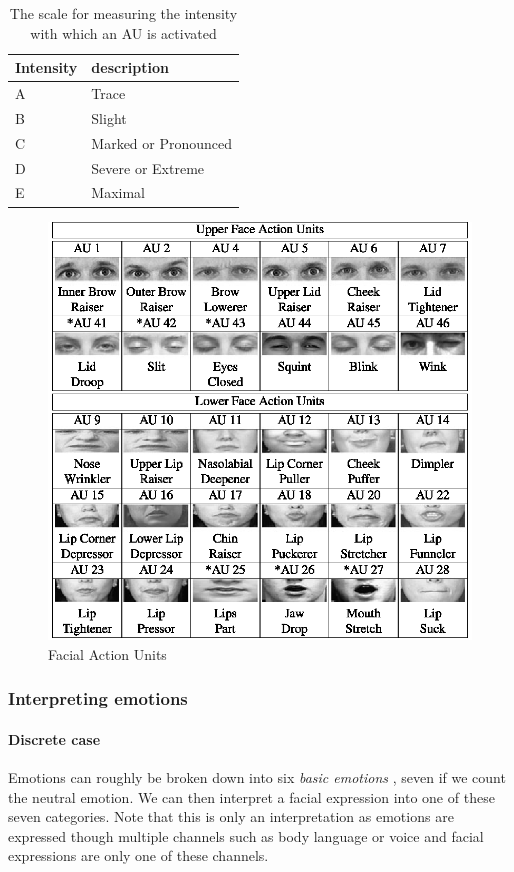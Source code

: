 \documentclass[12pt,twoside]{article}
\begin{document}
\begin{table}[ht]
\centering
\begin{tabular}{|l|l|}
 \hline
 Intensity & description\\
 \hline
 A & Trace                \\
 B & Slight               \\
 C & Marked or Pronounced \\
 D & Severe or Extreme    \\
 E & Maximal              \\
 \hline
\end{tabular}
\caption{The scale for measuring the intensity with which an AU is activated}
\label{tab:scale-au}
\end{table}

\begin{figure}
\centering
\includegraphics[scale=1]{./figures/faus.eps}
\caption{Facial Action Units}
\label{fig:fau}
\end{figure}

\subsubsection{Interpreting emotions}

\paragraph{Discrete case}
Emotions can roughly be broken down into six \textit{basic emotions} \cite{RefWorks:12}, seven if we count the neutral emotion. We can then interpret a facial expression into one of these seven categories. Note that this is only an interpretation as emotions are expressed though multiple channels such as body language or voice and facial expressions are only one of these channels.
\end{document}
